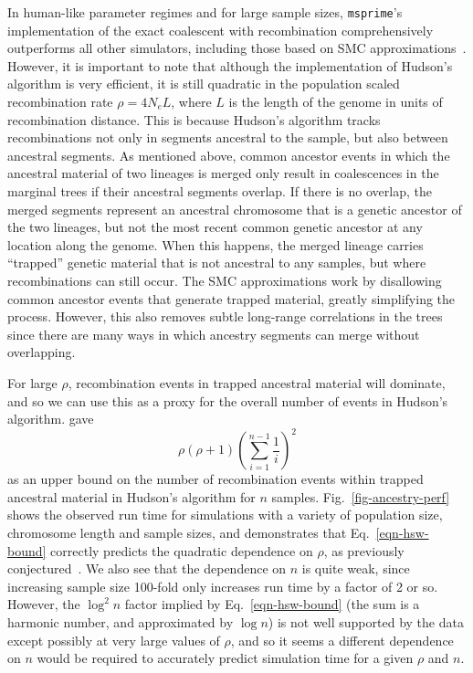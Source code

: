 \documentclass{article}
\newcommand{\msprime}[0]{\texttt{msprime}}
\begin{document}
In human-like parameter regimes and for large sample sizes,
\msprime's implementation of the
exact coalescent with recombination comprehensively outperforms
all other simulators, including those based on SMC
approximations~\citep{kelleher2016efficient}. However, it is important
to note that although the implementation of Hudson's algorithm is
very efficient, it is still quadratic in the population scaled recombination rate
$\rho = 4 N_e L$, where $L$ is the length of the genome in units of recombination distance.
This is because Hudson's algorithm tracks recombinations not only
in segments ancestral to the sample, but also between ancestral segments.
As mentioned above, common ancestor events in which the ancestral material
of two lineages is merged only result in coalescences in the marginal trees
if their ancestral segments overlap. If there is no overlap, the merged
segments represent an ancestral chromosome that is a genetic ancestor
of the two lineages, but not the most recent common genetic ancestor
at any location along the genome.
When this happens, the merged lineage carries ``trapped'' genetic material
that is not ancestral to any samples, but where recombinations can still occur.
The SMC approximations work by disallowing common ancestor events
that generate trapped material, greatly simplifying the process.
However, this also removes subtle long-range
correlations in the trees since there are many ways in which ancestry
segments can merge without overlapping.

For large $\rho$, recombination events in trapped ancestral material will
dominate, and so we can use this as a proxy for the overall number
of events in Hudson's algorithm.
\citet[Eq.~5.10]{hein2004gene} gave
\begin{equation}\label{eqn-hsw-bound}
\rho (\rho + 1) \left( \sum_{i=1}^{n-1} \frac{1}{i} \right)^2
\end{equation}
as an upper bound
on the number of recombination events within trapped ancestral material
in Hudson's algorithm for $n$ samples.
Fig.~\ref{fig-ancestry-perf} shows the observed run time for
simulations with a variety of population size, chromosome
length and sample sizes, and demonstrates that Eq.~\eqref{eqn-hsw-bound}
correctly predicts the quadratic dependence on $\rho$,
as previously conjectured~\citep[Fig.~2]{kelleher2016efficient}.
We also see that the dependence on $n$ is quite weak,
since increasing sample size 100-fold
only increases run time by a factor of 2 or so. However, the
$\log^2{n}$ factor implied by Eq.~\eqref{eqn-hsw-bound}
(the sum is a harmonic number, and approximated by $\log{n}$)
is not well supported by the data except possibly at very
large values of $\rho$, and so it seems a different dependence
on $n$ would be required to accurately predict simulation time for a
given $\rho$ and $n$.
\end{document}
